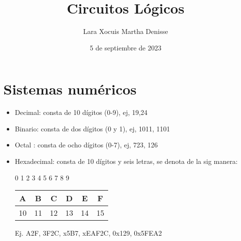 \documentclass[letterpaper,12pt]{article}
\title {\textbf{Circuitos Lógicos}}
\author{Lara Xocuis Martha Denisse}
\date{5 de septiembre de 2023}
\begin{document}
\begin{sloppypar}
\section{Sistemas numéricos}
\begin{itemize}
    \item Decimal: consta de 10 dígitos (0-9), ej, 19,24 
    \item Binario: consta de dos dígitos (0 y 1), ej, 1011, 1101
    \item Octal : consta de ocho dígitos (0-7), ej, 723, 126
    \item Hexadecimal: consta de 10 dígitos y seis letras, se denota de la sig manera:
    
    0 1 2 3 4 5 6 7 8 9

    \begin{table}[H]
        \centering
        \begin{tabular}{|c|c|c|c|c|c|}
            \hline 
            A & B & C & D & E & F \\ 
            \hline
            10 & 11 & 12 & 13 & 14 & 15 \\ 
            \hline
        \end{tabular}
    \end{table}

    Ej. A2F, 3F2C, x5B7, xEAF2C, 0x129, 0x5FEA2
\end{itemize}

\end{sloppypar}
\end{document}
